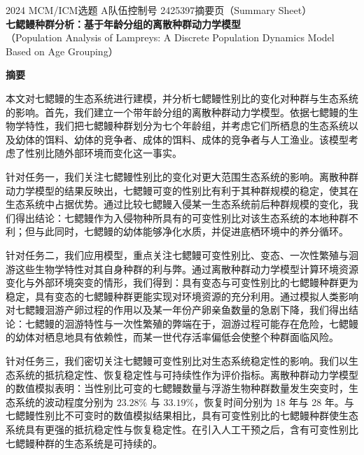 \documentclass[11pt,a4paper]{ctexart}
\begin{document}
\thispagestyle{empty}
\begin{center}
{\small 2024 MCM/ICM\quad 选题 A\quad 队伍控制号 2425397\quad 摘要页（Summary Sheet）}\\[18pt]
{\LARGE\bfseries 七鳃鳗种群分析：基于年龄分组的离散种群动力学模型}\\[8pt]
{\large （Population Analysis of Lampreys: A Discrete Population Dynamics Model Based on Age Grouping）}\\[10pt]
\end{center}

\begin{center}
{\large\bfseries 摘\quad 要}
\end{center}

\vspace{6pt}
本文对七鳃鳗的生态系统进行建模，并分析七鳃鳗性别比的变化对种群与生态系统的影响。首先，我们建立一个带年龄分组的离散种群动力学模型。依据七鳃鳗的生物学特性，我们把七鳃鳗种群划分为七个年龄组，并考虑它们所栖息的生态系统以及幼体的饵料、幼体的竞争者、成体的饵料、成体的竞争者与人工渔业。该模型考虑了性别比随外部环境而变化这一事实。

针对任务一，我们关注七鳃鳗性别比的变化对更大范围生态系统的影响。离散种群动力学模型的结果反映出，七鳃鳗可变的性别比有利于其种群规模的稳定，使其在生态系统中占据优势。通过比较七鳃鳗入侵某一生态系统前后种群规模的变化，我们得出结论：七鳃鳗作为入侵物种所具有的可变性别比对该生态系统的本地种群不利；但与此同时，七鳃鳗的幼体能够净化水质，并促进底栖环境中的养分循环。

针对任务二，我们应用模型，重点关注七鳃鳗可变性别比、变态、一次性繁殖与洄游这些生物学特性对其自身种群的利与弊。通过离散种群动力学模型计算环境资源变化与外部环境突变的情形，我们得到：具有变态与可变性别比的七鳃鳗种群更为稳定，具有变态的七鳃鳗种群更能实现对环境资源的充分利用。通过模拟人类影响对七鳃鳗洄游产卵过程的作用以及某一年份产卵亲鱼数量的急剧下降，我们得出结论：七鳃鳗的洄游特性与一次性繁殖的弊端在于，洄游过程可能存在危险，七鳃鳗的幼体对栖息地具有依赖性，而某一世代存活率偏低会使整个种群面临风险。

针对任务三，我们密切关注七鳃鳗可变性别比对生态系统稳定性的影响。我们以生态系统的抵抗稳定性、恢复稳定性与可持续性作为评价指标。离散种群动力学模型的数值模拟表明：当性别比可变的七鳃鳗数量与浮游生物种群数量发生突变时，生态系统的波动程度分别为 $23.28\%$ 与 $33.19\%$，恢复时间分别为 18 年与 28 年。与七鳃鳗性别比不可变时的数值模拟结果相比，具有可变性别比的七鳃鳗种群使生态系统具有更强的抵抗稳定性与恢复稳定性。在引入人工干预之后，含有可变性别比七鳃鳗种群的生态系统是可持续的。
\end{document}
